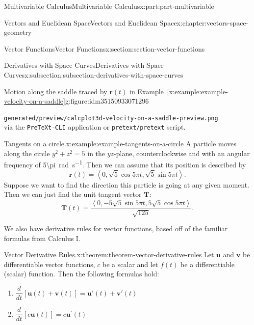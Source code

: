 \documentclass[twoside,10pt,]{book}
\newcommand{\xreffont}{\relax}
\newcommand{\mono}[1]{\texttt{#1}}
\numberwithin{equation}{part}
\newlength{\qrsize}
\newlength{\previewwidth}
\newcommand{\vb}[1]{\mathbf{#1}}
\newcommand{\dv}[3][]{\dfrac{d^{#1} #2}{d #3^{#1}}}
\newcommand{\dotprod}[1]{\left\langle #1 \right\rangle}
\begin{document}
\begin{partptx}{Multivariable Calculus}{}{Multivariable Calculus}{}{}{x:part:part-multivariable}
\begin{chapterptx}{Vectors and Euclidean Space}{}{Vectors and Euclidean Space}{}{}{x:chapter:vectors-space-geometry}
\begin{sectionptx}{Vector Functions}{}{Vector Functions}{}{}{x:section:section-vector-functions}
\begin{subsectionptx}{Derivatives with Space Curves}{}{Derivatives with Space Curves}{}{}{x:subsection:subsection-derivatives-with-space-curves}
\begin{figureptx}{Motion along the saddle traced by \(\vb{r}(t)\) in \hyperref[x:example:example-velocity-on-a-saddle]{Example~{\xreffont\ref{x:example:example-velocity-on-a-saddle}}}}{g:figure:idm35150933071296}{}
\begin{tcbraster}[raster columns=2, raster column skip=1pt, raster halign=center, raster force size=false, raster left skip=0pt, raster right skip=0pt]
\begin{tcolorbox}[previewstyle, width=\previewwidth]
{\mono{generated/preview/calcplot3d-velocity-on-a-saddle-preview.png}\\%
via the \mono{PreTeXt-CLI} application or \mono{pretext/pretext} script.}%
\end{tcolorbox}%
\begin{tcolorbox}[qrstyle]%
{\hypersetup{urlcolor=black}}%
\end{tcolorbox}%
\end{tcbraster}%
\tcblower
\end{figureptx}%
\begin{example}{Tangents on a circle.}{x:example:example-tangents-on-a-circle}%
A particle moves along the circle \(y^{2}+z^{2}=5\) in the \(yz\)-plane, counterclockwise and with an angular frequency of \SI{5\pi}{\radian\per\second}. Then we can assume that its position is described by%
%
\begin{equation*}
\mathbf{r}(t) = \dotprod{0,\sqrt{5}\cos5\pi t, \sqrt{5}\sin5\pi t}.
\end{equation*}
Suppose we want to find the direction this particle is going at any given moment. Then we can just find the unit tangent vector \(\mathbf{T}\):%
%
\begin{equation*}
\mathbf{T}(t) = \frac{\dotprod{0,-5\sqrt{5}\sin5\pi t, 5\sqrt{5}\cos5\pi t}}{\sqrt{125}}.
\end{equation*}
\end{example}
We also have derivative rules for vector functions, based off of the familiar formulas from Calculus I.%
\begin{theorem}{Vector Derivative Rules.}{}{x:theorem:theorem-vector-derivative-rules}%
%
Let \(\mathbf{u}\) and \(\mathbf{v}\) be differentiable vector functions, \(c\) be a scalar and let \(f(t)\) be a differentiable (scalar) function. Then the following formulas hold:%
%
\begin{enumerate}
\item{}\(\displaystyle \dv{}{t}[\mathbf{u}(t)+\mathbf{v}(t)] = \mathbf{u}'(t)+\mathbf{v}'(t)\)%
\item{}\(\displaystyle \dv{}{t}[c\mathbf{u}(t)] = c\mathbf{u}^{\prime}(t)\)%

\end{enumerate}
\end{theorem}
\end{subsectionptx}
\end{sectionptx}
\end{chapterptx}
\end{partptx}
\end{document}
